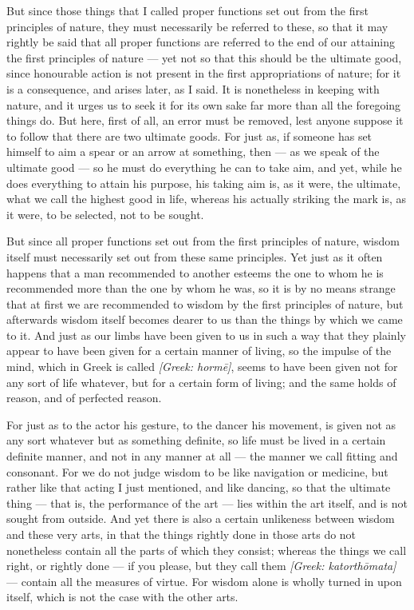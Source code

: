  But since those things that I called proper functions set out from the first principles of nature, they must necessarily be referred to these, so that it may rightly be said that all proper functions are referred to the end of our attaining the first principles of nature — yet not so that this should be the ultimate good, since honourable action is not present in the first appropriations of nature; for it is a consequence, and arises later, as I said. It is nonetheless in keeping with nature, and it urges us to seek it for its own sake far more than all the foregoing things do. But here, first of all, an error must be removed, lest anyone suppose it to follow that there are two ultimate goods. For just as, if someone has set himself to aim a spear or an arrow at something, then — as we speak of the ultimate good — so he must do everything he can to take aim, and yet, while he does everything to attain his purpose, his taking aim is, as it were, the ultimate, what we call the highest good in life, whereas his actually striking the mark is, as it were, to be selected, not to be sought.

 But since all proper functions set out from the first principles of nature, wisdom itself must necessarily set out from these same principles. Yet just as it often happens that a man recommended to another esteems the one to whom he is recommended more than the one by whom he was, so it is by no means strange that at first we are recommended to wisdom by the first principles of nature, but afterwards wisdom itself becomes dearer to us than the things by which we came to it. And just as our limbs have been given to us in such a way that they plainly appear to have been given for a certain manner of living, so the impulse of the mind, which in Greek is called \textit{[Greek: hormē]}, seems to have been given not for any sort of life whatever, but for a certain form of living; and the same holds of reason, and of perfected reason.

 For just as to the actor his gesture, to the dancer his movement, is given not as any sort whatever but as something definite, so life must be lived in a certain definite manner, and not in any manner at all — the manner we call fitting and consonant. For we do not judge wisdom to be like navigation or medicine, but rather like that acting I just mentioned, and like dancing, so that the ultimate thing — that is, the performance of the art — lies within the art itself, and is not sought from outside. And yet there is also a certain unlikeness between wisdom and these very arts, in that the things rightly done in those arts do not nonetheless contain all the parts of which they consist; whereas the things we call right, or rightly done — if you please, but they call them \textit{[Greek: katorthōmata]} — contain all the measures of virtue. For wisdom alone is wholly turned in upon itself, which is not the case with the other arts.


